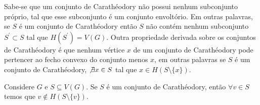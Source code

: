 



Sabe-se que um conjunto de Carathéodory não possui nenhum subconjunto próprio, tal que esse subconjunto é um conjunto envoltório\cite{Barbosa2012}. Em outras palavras, se $S$ é um conjunto de Carathéodory então $S$ não contém nenhum subconjunto $S^\prime \subset S$ tal que $H(S^\prime)=V(G)$. Outra propriedade derivada sobre os conjuntos de Carathéodory é que nenhum vértice $x$ de um conjunto de Carathéodory pode pertencer ao fecho convexo do conjunto menos $x$, em outras palavras se $S$ é um conjunto de Carathéodory,
$\not \exists x \in S$ tal que $x\in H(S\setminus\{x\})$.


\begin{observation}
 \label{prop:partial} 
Considere $G$ e $S \subseteq V(G)$. Se $S$ é um conjunto de Carathéodory, então $\forall v \in S$ temos que $v \notin H(S\setminus \{v\})$.
 \end{observation}


